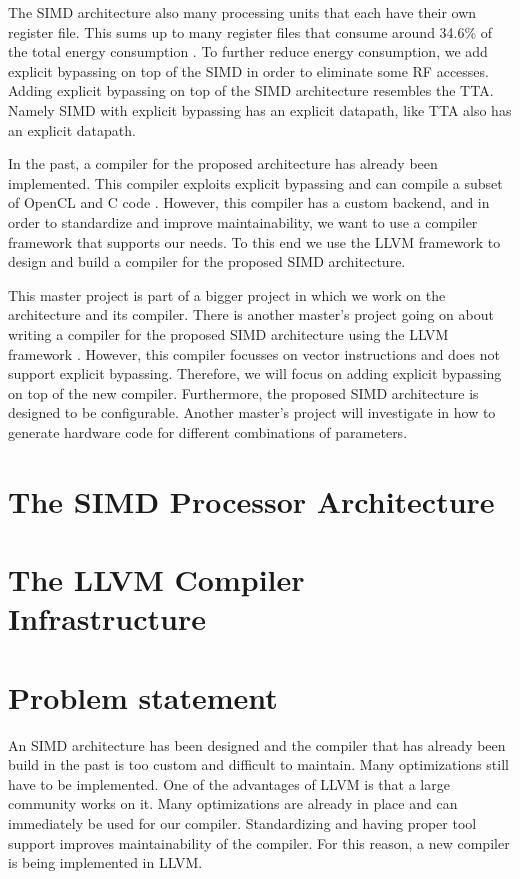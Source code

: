  The SIMD architecture also many processing units that each have their own register file. This sums up to many register files that consume around 34.6\% of the total energy consumption \cite{dongrio1}. To further reduce energy consumption, we add explicit bypassing on top of the SIMD in order to eliminate some RF accesses. Adding explicit bypassing on top of the SIMD architecture resembles the TTA. Namely SIMD with explicit bypassing has an explicit datapath, like TTA also has an explicit datapath.

In the past, a compiler for the proposed architecture has already been implemented. This compiler exploits explicit bypassing \cite{dongrio1} and can compile a subset of OpenCL and C code \cite{dongrio2}. However, this compiler has a custom backend, and in order to standardize and improve maintainability, we want to use a compiler framework that supports our needs. To this end we use the LLVM framework to design and build a compiler for the proposed SIMD architecture.

This master project is part of a bigger project in which we work on the architecture and its compiler. There is another master's project going on about writing a compiler for the proposed SIMD architecture using the LLVM framework \cite{liu_zhenyuan}. However, this compiler focusses on vector instructions and does not support explicit bypassing. Therefore, we will focus on adding explicit bypassing on top of the new compiler. Furthermore, the proposed SIMD architecture is designed to be configurable. Another master's project will investigate in how to generate hardware code for different combinations of parameters.%

\section{The SIMD Processor Architecture}\label{sec:simd}


\section{The LLVM Compiler Infrastructure}\label{sec:llvm}


\section{Problem statement}
An SIMD architecture has been designed and the compiler that has already been build in the past is too custom and difficult to maintain. Many optimizations still have to be implemented. One of the advantages of LLVM is that a large community works on it. Many optimizations are already in place and can immediately be used for our compiler. Standardizing and having proper tool support improves maintainability of the compiler. %
For this reason, a new compiler is being implemented in LLVM.

